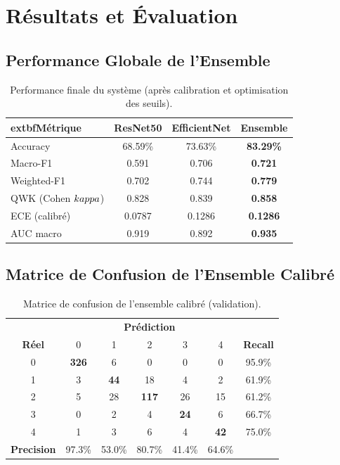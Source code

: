 \documentclass[12pt,a4paper,oneside]{report}
\begin{document}
\section{Résultats et Évaluation}

\subsection{Performance Globale de l'Ensemble}

\begin{table}[H]
\centering
\caption{Performance finale du système (après calibration et optimisation des seuils).}
\label{tab:final_performance}
\begin{tabular}{|l|c|c|c|}
\hline
	extbf{Métrique} & \textbf{ResNet50} & \textbf{EfficientNet} & \textbf{Ensemble} \\
\hline
Accuracy & 68.59\% & 73.63\% & \textbf{83.29\%} \\
Macro-F1 & 0.591 & 0.706 & \textbf{0.721} \\
Weighted-F1 & 0.702 & 0.744 & \textbf{0.779} \\
QWK (Cohen $\\kappa$) & 0.828 & 0.839 & \textbf{0.858} \\
ECE (calibré) & 0.0787 & 0.1286 & \textbf{0.1286} \\
AUC macro & 0.919 & 0.892 & \textbf{0.935} \\
\hline
\end{tabular}
\end{table}

\subsection{Matrice de Confusion de l'Ensemble Calibré}

\begin{table}[H]
\centering
\caption{Matrice de confusion de l'ensemble calibré (validation).}
\label{tab:confusion_matrix}
\begin{tabular}{|c|ccccc|c|}
\hline
& \multicolumn{5}{c|}{\textbf{Prédiction}} & \\
\textbf{Réel} & 0 & 1 & 2 & 3 & 4 & \textbf{Recall} \\
\hline
0 & \textbf{326} & 6 & 0 & 0 & 0 & 95.9\% \\
1 & 3 & \textbf{44} & 18 & 4 & 2 & 61.9\% \\
2 & 5 & 28 & \textbf{117} & 26 & 15 & 61.2\% \\
3 & 0 & 2 & 4 & \textbf{24} & 6 & 66.7\% \\
4 & 1 & 3 & 6 & 4 & \textbf{42} & 75.0\% \\
\hline
\textbf{Precision} & 97.3\% & 53.0\% & 80.7\% & 41.4\% & 64.6\% & \\
\hline
\end{tabular}
\end{table}
\end{document}
